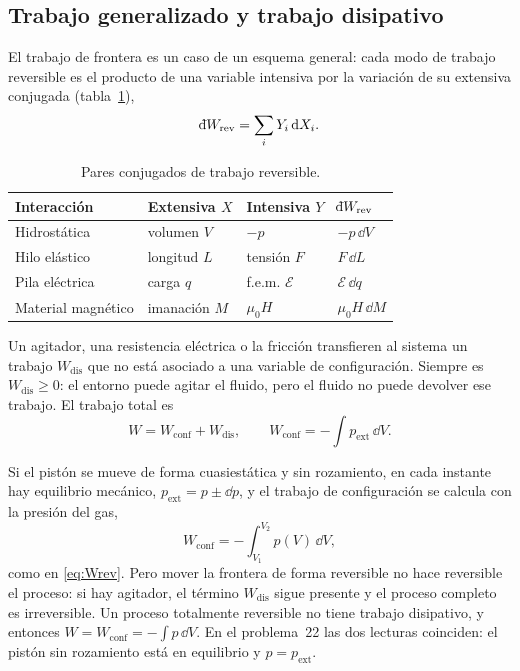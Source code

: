 \subsection{Trabajo generalizado y trabajo disipativo}

El trabajo de frontera es un caso de un esquema general: cada modo de trabajo reversible es el producto de
una variable intensiva por la variación de su extensiva conjugada (tabla~\ref{tab:pares}),
\begin{equation}\label{eq:Wgen}
  \dbar W_{\mathrm{rev}}=\sum_i Y_i\,\dd X_i .
\end{equation}

\begin{table}[htbp]
\centering
\caption{Pares conjugados de trabajo reversible.}
\label{tab:pares}
\small
\renewcommand{\arraystretch}{1.3}
\begin{tabular}{llll}
\toprule
Interacción & Extensiva $X$ & Intensiva $Y$ & $\dbar W_{\mathrm{rev}}$\\
\midrule
Hidrostática & volumen $V$ & $-p$ & $-p\,\dd V$\\
Hilo elástico & longitud $L$ & tensión $F$ & $F\,\dd L$\\
Pila eléctrica & carga $q$ & f.e.m. $\mathcal E$ & $\mathcal E\,\dd q$\\
Material magnético & imanación $M$ & $\mu_0H$ & $\mu_0H\,\dd M$\\
\bottomrule
\end{tabular}
\end{table}

\begin{definicion}
Un agitador, una resistencia eléctrica o la fricción transfieren al sistema un trabajo $W_{\mathrm{dis}}$ que
no está asociado a una variable de configuración. Siempre es $W_{\mathrm{dis}}\geq0$: el entorno puede
agitar el fluido, pero el fluido no puede devolver ese trabajo. El trabajo total es
\begin{equation}\label{eq:Wdis}
  W=W_{\mathrm{conf}}+W_{\mathrm{dis}},\qquad W_{\mathrm{conf}}=-\int p_{\mathrm{ext}}\,\dd V .
\end{equation}
\end{definicion}

\begin{observacion}
Si el pistón se mueve de forma cuasiestática y sin rozamiento, en cada instante hay equilibrio mecánico,
$p_{\mathrm{ext}}=p\pm\dd p$, y el trabajo de configuración se calcula con la presión del gas,
\[
  W_{\mathrm{conf}}=-\int_{V_1}^{V_2}p(V)\,\dd V,
\]
como en \eqref{eq:Wrev}. Pero mover la frontera de forma reversible no hace reversible el proceso: si hay
agitador, el término $W_{\mathrm{dis}}$ sigue presente y el proceso completo es irreversible. Un proceso
totalmente reversible no tiene trabajo disipativo, y entonces $W=W_{\mathrm{conf}}=-\int p\,\dd V$. En el
problema~22 las dos lecturas coinciden: el pistón sin rozamiento está en equilibrio y $p=p_{\mathrm{ext}}$.
\end{observacion}

